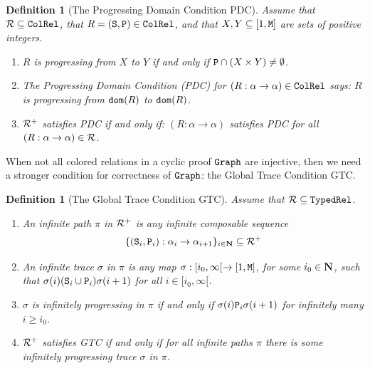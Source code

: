 \documentclass{lmcs}
\newtheorem{definition}[theorem]{Definition}
\begin{document}
\begin{definition}[The Progressing Domain Condition PDC]
\label{definition-PDC}
Assume that ${\mathcal R} \subseteq {\tt ColRel}$, that $R=({\tt S},{\tt P}) \in {\tt ColRel}$, and that 
$X,Y \subseteq [1,{\tt M}]$ are sets of positive integers.

\begin{enumerate}
\item
\label{definition-PDC-01}
$R$ is \emph{progressing from $X$ to $Y$} if and only if 
${\tt P} \cap (X \times Y) \not = \emptyset$.

\item
\label{definition-PDC-02}
The \emph{Progressing Domain Condition (PDC)} for 
$(R : \alpha \rightarrow \alpha)  \in {\tt ColRel}$ says: 
$R$ is progressing from ${\tt dom}(R)$ to ${\tt dom}(R)$.

\item
\label{definition-PDC-03}
\emph{${\mathcal R}^+$ satisfies PDC} if and only if: $(R : \alpha \rightarrow \alpha)$ satisfies PDC
for all $(R : \alpha \rightarrow \alpha) \in {\mathcal R}$.
\end{enumerate}
\end{definition}

When not all colored relations in a cyclic proof ${\tt Graph}$ are injective, then we need a stronger
condition for correctness of ${\tt Graph}$: the Global Trace Condition GTC.

\begin{definition}[The Global Trace Condition GTC]
\label{definition-GTC}
Assume that ${\mathcal R} \subseteq {\tt TypedRel}$.

\begin{enumerate}
\item
\label{definition-GTC-01}
An infinite path $\pi$ in ${\mathcal R}^+ $ is any infinite composable sequence
$$\{({\tt S}_i, {\tt P}_i):  \alpha_i \rightarrow \alpha_{i+1}\}_{i \in {\bf N}} \subseteq {\mathcal R}^+$$

\item
\label{definition-GTC-02}
An infinite trace $\sigma$ in $\pi$ is any map $\sigma: [i_0, \infty[ \rightarrow [1,{\tt M}]$, 
for some $i_0 \in {\bf N}$, such that $\sigma(i) ({\tt S}_i \cup {\tt P}_i) \sigma(i+1)$ 
for all $i \in [i_0, \infty[$. 

\item
\label{definition-GTC-03}
$\sigma$ is infinitely progressing in $\pi$ if and only if $\sigma(i) {\tt P}_i \sigma(i+1)$ 
for infinitely many $i \ge i_0$.

\item
\label{definition-GTC-04}
${\mathcal R}^+ $ satisfies GTC if and only if for all infinite paths
$\pi$ there is some infinitely progressing trace $\sigma$ in $\pi$.

\end{enumerate}
\end{definition}
\end{document}
